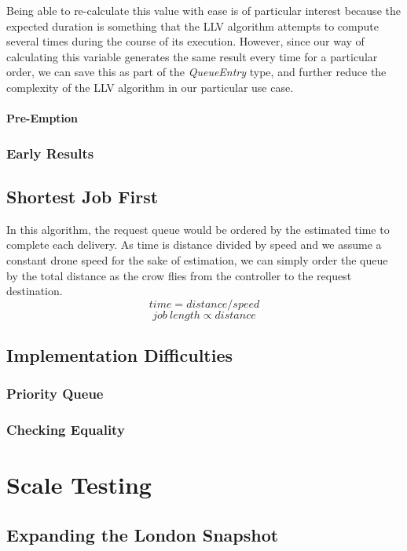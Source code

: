 \documentclass[a4paper,11pt,titlepage]{report}
\begin{document}
Being able to re-calculate this value with ease is of particular interest because the expected duration is something that the LLV algorithm attempts to compute several times during the course of its execution. However, since our way of calculating this variable generates the same result every time for a particular order, we can save this as part of the \textit{QueueEntry} type, and further reduce the complexity of the LLV algorithm in our particular use case.

\subsubsection{Pre-Emption}


\subsection{Early Results}


\section{Shortest Job First}
In this algorithm, the request queue would be ordered by the estimated time to complete each delivery. As time is distance divided by speed and we assume a constant drone speed for the sake of estimation, we can simply order the queue by the total distance as the crow flies from the controller to the request destination.
$$ time = distance / speed $$
$$ job\ length \propto distance $$

\section{Implementation Difficulties}
\subsection{Priority Queue}
\subsection{Checking Equality}


\newpage
\chapter{Scale Testing}
\section{Expanding the London Snapshot}
\end{document}
